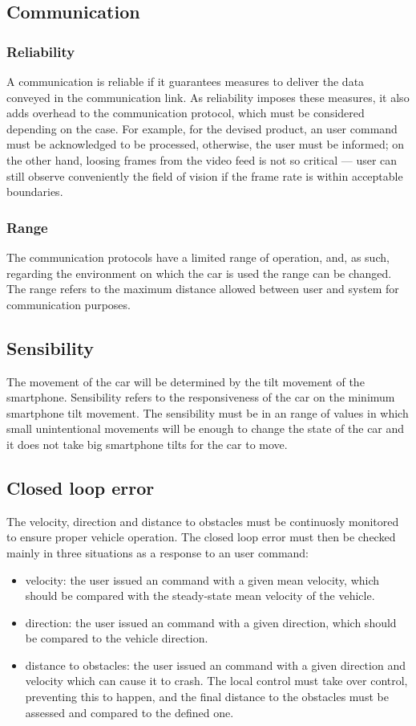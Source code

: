 \subsection{Communication}
\label{sec:org4241610}
\subsubsection{Reliability}
\label{sec:orgdcb920d}
A communication is reliable if it guarantees measures to deliver the data conveyed in the communication link. As reliability imposes these measures, it also adds overhead to the communication protocol, which must be considered depending on the case. For example, for the devised product, an user command must be acknowledged to be processed, otherwise, the user must be informed; on the other hand, loosing frames from the video feed is not so critical — user can still observe conveniently the ﬁeld of vision if the frame rate is within acceptable boundaries.
\subsubsection{Range}
\label{sec:org447a205}
The communication protocols have a limited range of operation, and, as such, regarding the environment on which the car is used the range can be changed.
The range refers to the maximum distance allowed between user and system for communication purposes.
\subsection{Sensibility}
\label{sec:org622e63a}
The movement of the car will be determined by the tilt movement of the smartphone. Sensibility refers to the responsiveness of the car on the minimum smartphone tilt movement. The sensibility must be in an range of values in which small unintentional movements will be enough to change the state of the car and it does not take big smartphone tilts for the car to move.
\subsection{Closed loop error}
\label{sec:org436f732}
The velocity, direction and distance to obstacles must be continuosly monitored to ensure proper vehicle operation. The closed loop error must then be checked mainly in three situations as a response to an user command:
\begin{itemize}
\item velocity: the user issued an command with a given mean velocity, which should be compared with the steady-state mean velocity of the vehicle.
\item direction: the user issued an command with a given direction, which should be compared to the vehicle direction.
\item distance to obstacles: the user issued an command with a given direction and velocity which can cause it to crash. The local control must take over control, preventing this to happen, and the final distance to the obstacles must be assessed and compared to the defined one.
\end{itemize}
